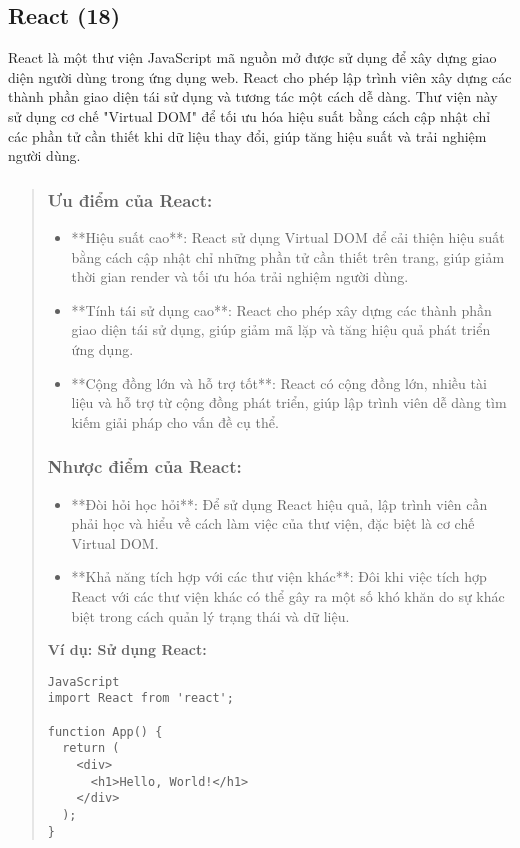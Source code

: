 \subsection{React (18)}
React là một thư viện JavaScript mã nguồn mở được sử dụng để xây dựng giao diện người dùng trong ứng dụng web. React cho phép lập trình viên xây dựng các thành phần giao diện tái sử dụng và tương tác một cách dễ dàng. Thư viện này sử dụng cơ chế "Virtual DOM" để tối ưu hóa hiệu suất bằng cách cập nhật chỉ các phần tử cần thiết khi dữ liệu thay đổi, giúp tăng hiệu suất và trải nghiệm người dùng.

\begin{quote}
\subsubsection{Ưu điểm của React:}
\begin{itemize}
  \item **Hiệu suất cao**: React sử dụng Virtual DOM để cải thiện hiệu suất bằng cách cập nhật chỉ những phần tử cần thiết trên trang, giúp giảm thời gian render và tối ưu hóa trải nghiệm người dùng.
  \item **Tính tái sử dụng cao**: React cho phép xây dựng các thành phần giao diện tái sử dụng, giúp giảm mã lặp và tăng hiệu quả phát triển ứng dụng.
  \item **Cộng đồng lớn và hỗ trợ tốt**: React có cộng đồng lớn, nhiều tài liệu và hỗ trợ từ cộng đồng phát triển, giúp lập trình viên dễ dàng tìm kiếm giải pháp cho vấn đề cụ thể.
\end{itemize}

\subsubsection{Nhược điểm của React:}
\begin{itemize}
  \item **Đòi hỏi học hỏi**: Để sử dụng React hiệu quả, lập trình viên cần phải học và hiểu về cách làm việc của thư viện, đặc biệt là cơ chế Virtual DOM.
  \item **Khả năng tích hợp với các thư viện khác**: Đôi khi việc tích hợp React với các thư viện khác có thể gây ra một số khó khăn do sự khác biệt trong cách quản lý trạng thái và dữ liệu.
\end{itemize}

\textbf{Ví dụ: Sử dụng React:}
\begin{lstlisting}
JavaScript
import React from 'react';

function App() {
  return (
    <div>
      <h1>Hello, World!</h1>
    </div>
  );
}
\end{lstlisting}
\end{quote}


